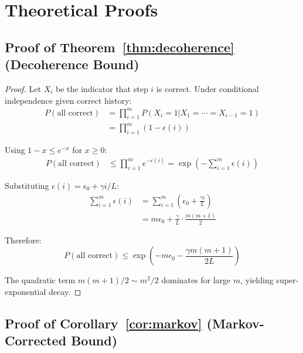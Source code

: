 \documentclass{article}
\theoremstyle{plain}
\theoremstyle{definition}
\theoremstyle{remark}
\begin{document}

\section{Theoretical Proofs}
\label{app:proofs}

\subsection{Proof of Theorem~\ref{thm:decoherence} (Decoherence Bound)}

\begin{proof}
Let $X_i$ be the indicator that step $i$ is correct. Under conditional independence given correct history:
\begin{align}
P(\text{all correct}) &= \prod_{i=1}^{m} P(X_i = 1 | X_1 = \cdots = X_{i-1} = 1) \\
&= \prod_{i=1}^{m} (1 - \epsilon(i))
\end{align}

Using $1 - x \leq e^{-x}$ for $x \geq 0$:
\begin{align}
P(\text{all correct}) &\leq \prod_{i=1}^{m} e^{-\epsilon(i)} = \exp\left(-\sum_{i=1}^{m} \epsilon(i)\right)
\end{align}

Substituting $\epsilon(i) = \epsilon_0 + \gamma i / L$:
\begin{align}
\sum_{i=1}^{m} \epsilon(i) &= \sum_{i=1}^{m} \left(\epsilon_0 + \frac{\gamma i}{L}\right) \\
&= m\epsilon_0 + \frac{\gamma}{L} \cdot \frac{m(m+1)}{2}
\end{align}

Therefore:
\begin{equation}
P(\text{all correct}) \leq \exp\left(-m\epsilon_0 - \frac{\gamma m(m+1)}{2L}\right)
\end{equation}

The quadratic term $m(m+1)/2 \sim m^2/2$ dominates for large $m$, yielding super-exponential decay.
\end{proof}

\subsection{Proof of Corollary~\ref{cor:markov} (Markov-Corrected Bound)}
\end{document}
